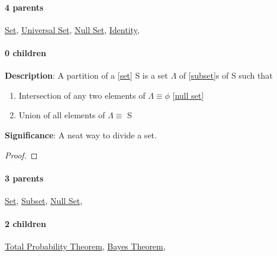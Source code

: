 \documentclass[../main.tex]{subfiles}
\begin{document}
\paragraph{4 parents} \hyperref[statement:Set]{Set}, \hyperref[statement:Universal Set]{Universal Set}, \hyperref[statement:Null Set]{Null Set}, \hyperref[statement:Identity]{Identity}, 
\paragraph{0 children} 



\begin{statement}
\label{statement:Partition}\hspace*{0pt}\par
\end{statement}
\textbf{Description}:
A partition of a [\hyperref[statement:Set]{set}] S is a set $ \Lambda $ of [\hyperref[statement:Subset]{subset}]s of S such that
\begin{enumerate}[nolistsep]
  \item Intersection of any two elements of $ \Lambda \equiv \phi $ [\hyperref[statement:Null Set]{null set}]
  \item Union of all elements of $ \Lambda \equiv $ S
\end{enumerate}

\par
{\color{magenta} \textbf{Significance}:
A neat way to divide a set.
\par}
\begin{proof}
\proofbydefinition
\end{proof}\par
\paragraph{3 parents} \hyperref[statement:Set]{Set}, \hyperref[statement:Subset]{Subset}, \hyperref[statement:Null Set]{Null Set}, 
\paragraph{2 children} \hyperref[statement:Total Probability Theorem]{Total Probability Theorem}, \hyperref[statement:Bayes Theorem]{Bayes Theorem}, 
\end{document}

